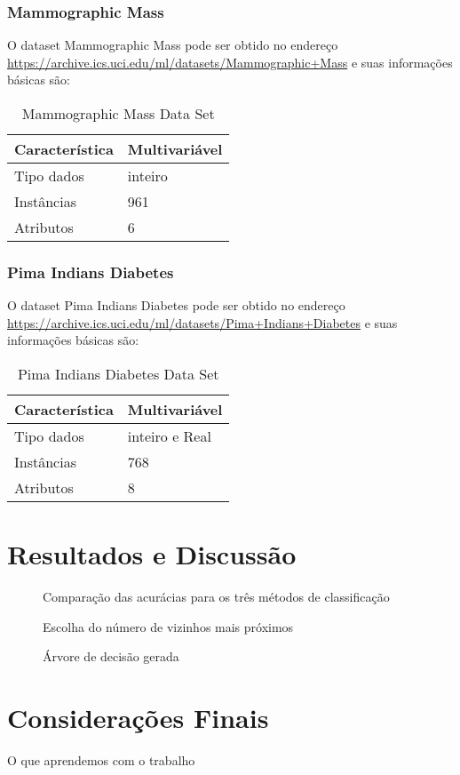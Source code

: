 \documentclass[12pt, a4paper, brazil]{article}
\begin{document}
\subsubsection{Mammographic Mass}
O dataset Mammographic Mass pode ser obtido no endereço \url{https://archive.ics.uci.edu/ml/datasets/Mammographic+Mass} e suas informações básicas são:
\begin{table}[!ht]
\centering
\caption{Mammographic Mass Data Set}
\label{mammographictable}
\begin{tabular}{|l|l|}
\hline
Característica & Multivariável\\
\hline
Tipo dados & inteiro \\
\hline
Instâncias & 961 \\
\hline
Atributos & 6\\
\hline
\end{tabular}
\end{table}

\subsubsection{Pima Indians Diabetes}
O dataset Pima Indians Diabetes pode ser obtido no endereço \url{https://archive.ics.uci.edu/ml/datasets/Pima+Indians+Diabetes} e suas informações básicas são:
\begin{table}[!ht]
\centering
\caption{Pima Indians Diabetes Data Set}
\label{pimatable}
\begin{tabular}{|l|l|}
\hline
Característica & Multivariável\\
\hline
Tipo dados & inteiro e Real \\
\hline
Instâncias & 768 \\
\hline
Atributos & 8\\
\hline
\end{tabular}
\end{table}

\section{Resultados e Discussão}

\begin{figure}[!htb]
  \caption{Comparação das acurácias para os três métodos de classificação}
  \centering
\end{figure}

\begin{figure}[!htb]
  \caption{Escolha do número de vizinhos mais próximos}
  \centering
\end{figure}

\begin{figure}[!htb]
  \caption{Árvore de decisão gerada}
  \centering
\end{figure}

\section{Considerações Finais}
O que aprendemos com o trabalho
\newpage

\end{document}
